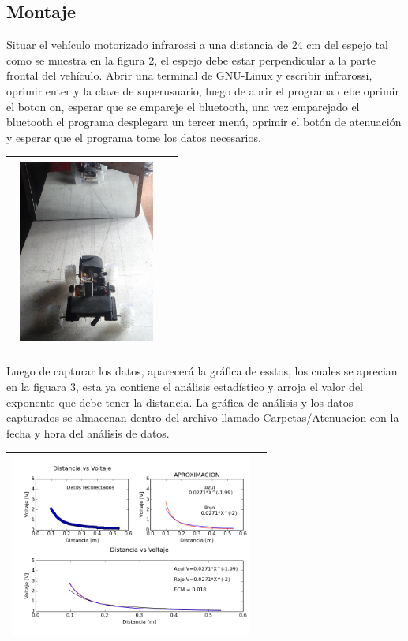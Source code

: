 \documentclass[12]{article}
\newenvironment{Figure}
{\par\medskip\noindent\minipage{\linewidth}}
{\endminipage\par\medskip}
\begin{document}
\begin{multicols}{2}
\subsection{Montaje}
Situar el vehículo motorizado infrarossi a una distancia de 24 cm del espejo tal como se muestra en la figura 2, el espejo debe estar perpendicular a la parte frontal del vehículo. Abrir una terminal de GNU-Linux y escribir infrarossi, oprimir enter y la clave de superusuario, luego de abrir el programa debe oprimir el boton on, esperar que se empareje el bluetooth, una vez emparejado el bluetooth el programa desplegara un tercer menú, oprimir el botón de atenuación y esperar que el programa tome los datos necesarios. 
\begin{Figure}	
\center
\begin{tabular}{|l|r|}
\hline \\
\includegraphics[width=5cm, height=6cm]{img/mon_ate.png} \\\\ \hline
\end{tabular}
\label{fig:g2}
\end{Figure}
Luego de capturar los datos, aparecerá la gráfica de esstos, los cuales se aprecian en la figuara 3, esta ya contiene el análisis estadístico y arroja el valor del exponente que debe tener la distancia. La gráfica de análisis y los datos capturados se almacenan dentro del archivo llamado Carpetas/Atenuacion con la fecha y hora del análisis de datos.
\begin{Figure}	
\center
\begin{tabular}{|l|r|}
\hline
\includegraphics[width=8cm, height=6cm]{img/Atenuacion.png} \\ \hline

\end{tabular}
\end{Figure}
\end{multicols}
\end{document}
